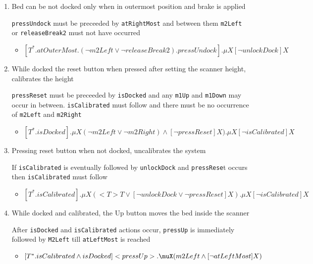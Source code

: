 \documentclass{article}
\begin{document}
\begin{enumerate}
    \item Bed can be not docked only when in outermost position and brake is applied
    
    \texttt{pressUndock} must be preceeded by \texttt{atRightMost} and between them \texttt{m2Left} or \texttt{releaseBreak2} must not have occurred
    \begin{itemize}
        \item [\textendash] $[T^{\ast}.atOuterMost.(\neg m2Left \vee \neg releaseBreak2).pressUndock].\mu X[\neg unlockDock]X$
    \end{itemize}


    \item While docked the reset button when pressed after setting the scanner height, calibrates the height
    
    \texttt{pressReset} must be preceeded by \texttt{isDocked} and any \texttt{m1Up} and \texttt{m1Down} may occur in between. \texttt{isCalibrated} must follow and there must be no occurrence of \texttt{m2Left} and \texttt{m2Right}
    \begin{itemize}
        \item [\textendash] $[T^{\ast}.isDocked].\mu X(\neg m2Left \vee \neg m2Right) \wedge [\neg pressReset]X).\mu X[\neg isCalibrated]X$
    \end{itemize}
    
    
    \item Pressing reset button when not docked, uncalibrates the system

    If \texttt{isCalibrated} is eventually followed by \texttt{unlockDock} and \texttt{pressRese}t occurs then \texttt{isCalibrated} must follow
    \begin{itemize}
        \item [\textendash] $[T^{\ast}.isCalibrated].\mu X(<T>T \vee [\neg unlockDock \vee \neg pressReset]X).\mu X[\neg isCalibrated]X$
    \end{itemize}


    \item While docked and calibrated, the Up button moves the bed inside the scanner
        
    After \texttt{isDocked} and \texttt{isCalibrated} actions occur, \texttt{pressUp} is immediately followed by \texttt{M2Left} till \texttt{atLeftMost} is reached
        
    \begin{itemize}
            \item [\textendash]$[T ^{\ast}.isCalibrated \wedge isDocked] <pressUp>.\muX(m2Left \wedge [\neg atLeftMost]X)$
    \end{itemize}


\end{enumerate}
\end{document}
